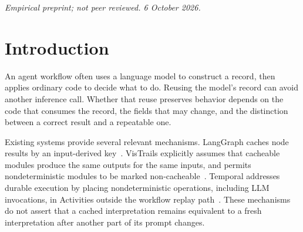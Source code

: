\begin{abstract}
Caching an agent step can change a downstream decision even when repeated calls to that step appear identical. We study this gap using frozen executions of synthetic procurement workflows with nondeterministic language-model steps and a deterministic approve/reject/escalate consumer. A recorded Gemma3 chain produces identical validated outputs on 260 configured temperature-zero same-prompt pairs for each feeding step, yet declared dependency reuse introduces two unsafe approvals on one request: a stable but wrong justification changes on a perturbed prompt that the declaration treats as irrelevant. We then evaluate a policy-specific decision-equivalence certificate using structured request differences, cached candidate outputs, fresh noncandidate outputs, and finite valid-output witnesses. Across three chain configurations it certifies 82.1--85.3\% of recorded perturbations and saves 50.5--52.1\% of nominal feeding-step call slots, with zero decision changes on certified, scoreable cases. One DeepSeek and 30 Phi4-mini rows are unscoreable; they remain in fraction denominators and receive no equivalence guarantee. The results distinguish observed repeatability, correctness, and consumer equivalence, and provide a reproducible offline test rather than a deployed reuse runtime.
\end{abstract}
\maketitle
\iflongversion
\noindent\textit{Empirical preprint; not peer reviewed. 6 October 2026.}
\fi

\section{Introduction}
An agent workflow often uses a language model to construct a record, then applies ordinary code to decide what to do. Reusing the model's record can avoid another inference call. Whether that reuse preserves behavior depends on the code that consumes the record, the fields that may change, and the distinction between a correct result and a repeatable one.

Existing systems provide several relevant mechanisms. LangGraph caches node results by an input-derived key~\cite{langgraph}. VisTrails explicitly assumes that cacheable modules produce the same outputs for the same inputs, and permits nondeterministic modules to be marked non-cacheable~\cite{vistrails}. Temporal addresses durable execution by placing nondeterministic operations, including LLM invocations, in Activities outside the workflow replay path~\cite{temporal}. These mechanisms do not assert that a cached interpretation remains equivalent to a fresh interpretation after another part of its prompt changes.

